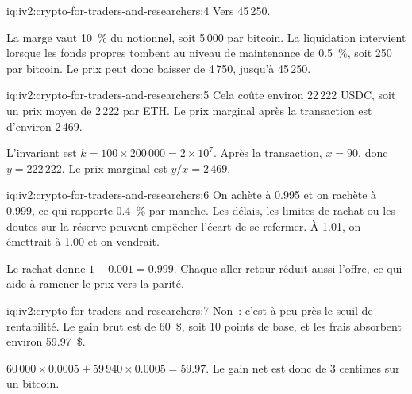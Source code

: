 \begin{solution}{iq:iv2:crypto-for-traders-and-researchers:4}
Vers 45\,250.

La marge vaut 10~\% du notionnel, soit 5\,000 par bitcoin. La liquidation intervient lorsque les fonds propres tombent au niveau de maintenance de 0.5~\%, soit 250 par bitcoin. Le prix peut donc baisser de 4\,750, jusqu'à 45\,250.

\end{solution}

\begin{solution}{iq:iv2:crypto-for-traders-and-researchers:5}
Cela coûte environ 22\,222 USDC, soit un prix moyen de 2\,222 par ETH. Le prix marginal après la transaction est d'environ 2\,469.

L'invariant est $k = 100 \times 200\,000 = 2 \times 10^7$. Après la transaction, $x = 90$, donc $y = 222\,222$. Le prix marginal est $y/x = 2\,469$.

\end{solution}

\begin{solution}{iq:iv2:crypto-for-traders-and-researchers:6}
On achète à 0.995 et on rachète à 0.999, ce qui rapporte 0.4~\% par manche. Les délais, les limites de rachat ou les doutes sur la réserve peuvent empêcher l'écart de se refermer. À 1.01, on émettrait à 1.00 et on vendrait.

Le rachat donne $1 - 0.001 = 0.999$. Chaque aller-retour réduit aussi l'offre, ce qui aide à ramener le prix vers la parité.

\end{solution}

\begin{solution}{iq:iv2:crypto-for-traders-and-researchers:7}
Non~: c'est à peu près le seuil de rentabilité. Le gain brut est de 60~\$, soit 10 points de base, et les frais absorbent environ 59.97~\$.

$60\,000 \times 0.0005 + 59\,940 \times 0.0005 = 59.97$. Le gain net est donc de 3 centimes sur un bitcoin.

\end{solution}

